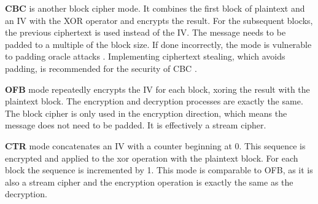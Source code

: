 \textbf{\ac{CBC}} is another block cipher mode. It combines the first block of plaintext and an \ac{IV} with the XOR operator and encrypts the result. For the subsequent blocks, the previous ciphertext is used instead of the IV. The message needs to be padded to a multiple of the block size. If done incorrectly, the mode is vulnerable to padding oracle attacks \cite{paddingoracle}. Implementing ciphertext stealing, which avoids padding, is recommended for the security of \ac{CBC} \cite{ciphertextstealing}.

\textbf{\ac{OFB}} mode repeatedly encrypts the IV for each block, xoring the result with the plaintext block. The encryption and decryption processes are exactly the same.
The block cipher is only used in the encryption direction, which means the message does not need to be padded. It is effectively a stream cipher.

%
\textbf{\ac{CTR}} mode concatenates an IV with a counter beginning at 0. This sequence is encrypted and applied to the xor operation with the plaintext block. For each block the sequence is incremented by 1.
This mode is comparable to \ac{OFB}, as it is also a stream cipher and the encryption operation is exactly the same as the decryption. %

